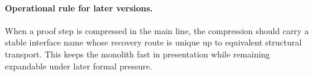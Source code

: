 \paragraph{Operational rule for later versions.}
When a proof step is compressed in the main line, the compression should carry a
stable interface name whose recovery route is unique up to equivalent structural
transport. This keeps the monolith fast in presentation while remaining expandable
under later formal pressure.

